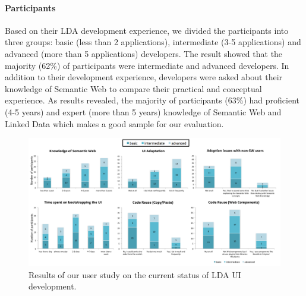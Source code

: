 \documentclass{llncs}
\begin{document}
\paragraph{Participants}
Based on their LDA development experience, we divided the participants into three groups: basic (less than 2 applications), intermediate (3-5 applications) and advanced (more than 5 applications) developers.
The result showed that the majority (62\%) of participants were intermediate and advanced developers.
In addition to their development experience, developers were asked about their knowledge of Semantic Web to compare their practical and conceptual experience.
As results revealed, the majority of participants (63\%) had proficient (4-5 years) and expert (more than 5 years) knowledge of Semantic Web and Linked Data which makes a good sample for our evaluation.

\begin{figure}[tb]
\center
  \includegraphics[width=1\linewidth]{images/userstudy.pdf}
  \caption{Results of our user study on the current status of LDA UI development.}
  \label{fig:userstudy}
\end{figure}
\end{document}
